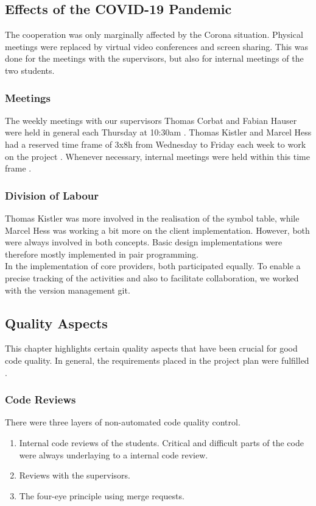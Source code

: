\subsection{Effects of the COVID-19 Pandemic}
The cooperation was only marginally affected by the Corona situation.
Physical meetings were replaced by virtual video conferences and screen sharing.
This was done for the meetings with the supervisors, but also for internal meetings of the two students.

\subsubsection{Meetings}
The weekly meetings with our supervisors Thomas Corbat and Fabian Hauser were held in general each Thursday at 10:30am \cite{projectplan}.
Thomas Kistler and Marcel Hess had a reserved time frame of 3x8h from Wednesday to
Friday each week to work on the project \cite{projectplan}.
Whenever necessary, internal meetings were held within this time frame \cite{projectplan}.

\subsubsection{Division of Labour}
Thomas Kistler was more involved in the realisation of the symbol table,
while Marcel Hess was working a bit more on the client implementation.
However, both were always involved in both concepts.
Basic design implementations were therefore mostly implemented in pair programming.\\

In the implementation of core providers, both participated equally.
To enable a precise tracking of the activities and also to facilitate collaboration,
we worked with the version management git.

\subsection{Quality Aspects}
This chapter highlights certain quality aspects that have been crucial for good code quality.
In general, the requirements placed in the project plan were fulfilled \cite{projectplan}.

\subsubsection{Code Reviews}
There were three layers of non-automated code quality control.
\begin{enumerate}
    \item Internal code reviews of the students. Critical and difficult parts of the code were always underlaying to a internal code review.
    \item Reviews with the supervisors.
    \item The four-eye principle using merge requests.
\end{enumerate}



